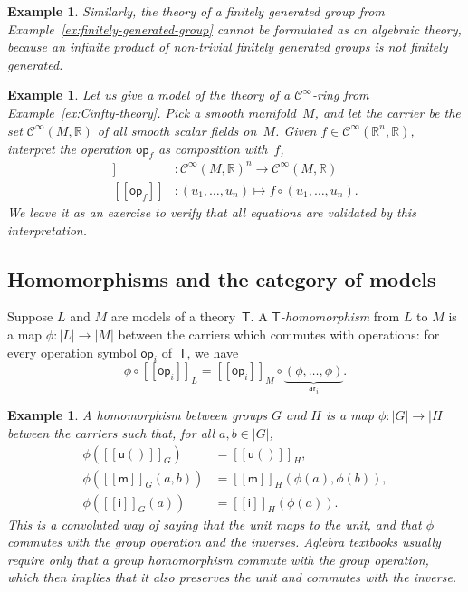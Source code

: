 \documentclass{amsart}
\newcommand{\RR}{\mathbb{R}} %
\newcommand{\theory}[1]{\mathsf{#1}} %
\newcommand{\carrier}[1]{|#1|} %
\newcommand{\op}[1]{\mathsf{op}_{#1}} %
\newcommand{\arity}[1]{\mathsf{ar}_{#1}} %
\newcommand{\Cinfty}{\mathcal{C}^\infty}
\newcommand{\sem}[1]{[\![#1]\!]} %
\newtheorem{example}[definition]{Example}
\begin{document}
\begin{example}
  Similarly, the theory of a finitely generated group from
  Example~\ref{ex:finitely-generated-group} cannot be formulated as an algebraic theory,
  because an infinite product of non-trivial finitely generated groups is not finitely
  generated.
\end{example}

\begin{example}
  Let us give a model of the theory of a $\Cinfty$-ring from
  Example~\ref{ex:Cinfty-theory}. Pick a smooth manifold~$M$, and let the carrier be the
  set $\Cinfty(M, \RR)$ of all smooth scalar fields on~$M$. Given
  $f \in \Cinfty(\RR^n, \RR)$, interpret the operation $\op{f}$ as composition with~$f$,
  \begin{align*}
    \sem{\op{f}} &: \Cinfty(M, \RR)^n \to \Cinfty(M, \RR) \\
    \sem{\op{f}} &: (u_1, \ldots, u_n) \mapsto f \circ (u_1, \ldots, u_n).
  \end{align*}
  We leave it as an exercise to verify that all equations are validated by this
  interpretation.
\end{example}

\subsection{Homomorphisms and the category of models}
\label{sec:homom-categ-models}

Suppose $L$ and $M$ are models of a theory~$\theory{T}$. A
\emph{$\theory{T}$-homomorphism} from $L$ to $M$ is a map $\phi : \carrier{L} \to \carrier{M}$ between the
carriers which commutes with operations: for every operation symbol $\op{i}$
of~$\theory{T}$, we have
%
\begin{equation*}
  \phi \circ \sem{\op{i}}_L = \sem{\op{i}}_M \circ \underbrace{(\phi, \ldots, \phi)}_{\arity{i}}.
\end{equation*}

\begin{example}
  A homomorphism between groups $G$ and $H$ is a map $\phi : \carrier{G} \to \carrier{H}$ between the
  carriers such that, for all $a, b \in \carrier{G}$,
  \begin{align*}
    \phi(\sem{\mathsf{u}()}_G) &= \sem{\mathsf{u}()}_H,\\
    \phi(\sem{\mathsf{m}}_G (a,b)) &= \sem{\mathsf{m}}_H (\phi(a), \phi(b)),\\
    \phi(\sem{\mathsf{i}}_G (a)) &= \sem{\mathsf{i}}_H (\phi(a)).
  \end{align*}
  This is a convoluted way of saying that the unit maps to the unit, and that
  $\phi$ commutes with the group operation and the inverses. Aglebra textbooks
  usually require only that a group homomorphism commute with the group
  operation, which then implies that it also preserves the unit and commutes
  with the inverse.
\end{example}
\end{document}
